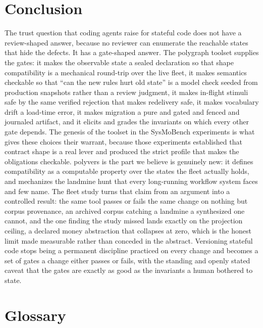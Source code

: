 \documentclass[11pt]{article}
\newcommand{\tool}[1]{\textsf{#1}}
\begin{document}
\section{Conclusion}

The trust question that coding agents raise for stateful code does not have a
review-shaped answer, because no reviewer can enumerate the reachable states
that hide the defects. It has a gate-shaped answer. The \tool{polygraph}
toolset supplies the gates: it makes the observable state a sealed declaration
so that shape compatibility is a mechanical round-trip over the live fleet, it
makes semantics checkable so that ``can the new rules hurt old state'' is a
model check seeded from production snapshots rather than a review judgment, it
makes in-flight stimuli safe by the same verified rejection that makes
redelivery safe, it makes vocabulary drift a load-time error, it makes
migration a pure and gated and fenced and journaled artifact, and it elicits
and grades the invariants on which every other gate depends. The genesis of the
toolset in the SysMoBench experiments is what gives these choices their
warrant, because those experiments established that contract shape is a real
lever and produced the strict profile that makes the obligations checkable.
\tool{polyvers} is the part we believe is genuinely new: it defines
compatibility as a computable property over the states the fleet actually
holds, and mechanizes the landmine hunt that every long-running workflow system
faces and few name. The fleet study turns that claim from an argument into a
controlled result: the same tool passes or fails the same change on nothing but
corpus provenance, an archived corpus catching a landmine a synthesized one
cannot, and the one finding the study missed lands exactly on the projection
ceiling, a declared money abstraction that collapses at zero, which is the honest
limit made measurable rather than conceded in the abstract. Versioning stateful
code stops being a permanent discipline
practiced on every change and becomes a set of gates a change either passes or
fails, with the standing and openly stated caveat that the gates are exactly as
good as the invariants a human bothered to state.

\appendix

\section*{Glossary}
\end{document}
